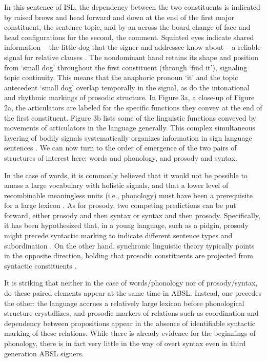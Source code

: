 \documentclass[output=paper]{langsci/langscibook}
\begin{document}
  In this sentence of ISL, the dependency between the two constituents is indicated by raised brows and head forward and down at the end of the first major constituent, the sentence topic, and by an across the board change of face and head configurations for the second, the comment.  Squinted eyes indicate shared information – the little dog that the signer and addressee know about – a reliable signal for relative clauses \citep{Nespor1998,Dachkovsky2009}. The nondominant hand retains its shape and position from ‘small dog’ throughout the first constituent (through ‘find it’), signaling topic continuity.  This means that the anaphoric pronoun ‘it’ and the topic antecedent ‘small dog’ overlap temporally in the signal, as do the intonational and rhythmic markings of prosodic structure. In Figure 3a, a close-up of Figure 2a, the articulators are labeled for the specific functions they convey at the end of the first constituent.  Figure 3b lists some of the linguistic functions conveyed by movements of articulators in the language generally. This complex simultaneous layering of bodily signals systematically organizes information in sign language sentences \citep{Wilbur2000}.  We can now turn to the order of emergence of the two pairs of structures of interest here: words and phonology, and prosody and syntax.  

 In the case of words, it is commonly believed that it would not be possible to amass a large vocabulary with holistic signals, and that a lower level of recombinable meaningless units (i.e., phonology) must have been a prerequisite for a large lexicon \citep{Hockett1960,Pinker2005}.  As for prosody, two competing predictions can be put forward, either prosody and then syntax or syntax and then prosody.  Specifically, it has been hypothesized that, in a young language, such as a pidgin, prosody might precede syntactic marking to indicate different sentence types and subordination \citep{Givón1979}.  On the other hand, synchronic linguistic theory typically points in the opposite direction, holding that prosodic constituents are projected from syntactic constituents \citep{Selkirk1984,Nespor1986}. 

\newpage 
It is striking that neither in the case of words/phonology nor of prosody/syntax, do these paired elements appear at the same time in ABSL.  Instead, one precedes the other:  the language accrues a relatively large lexicon before phonological structure crystallizes, and prosodic markers of relations such as coordination and dependency between propositions appear in the absence of identifiable syntactic marking of these relations.  While there is already evidence for the beginnings of phonology, there is in fact very little in the way of overt syntax even in third generation ABSL signers.   
\end{document}
